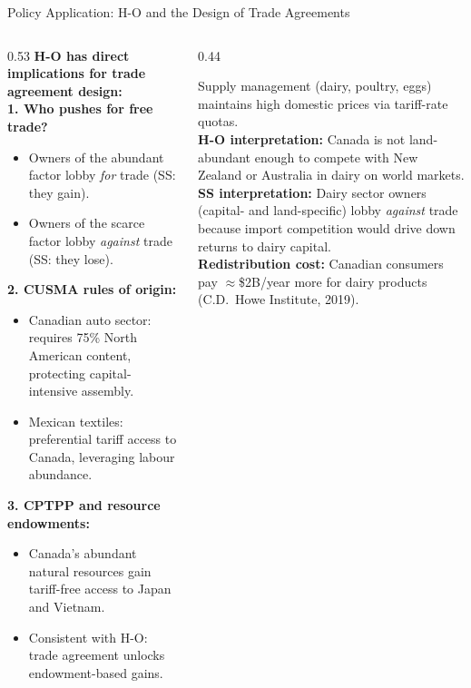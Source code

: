\documentclass[aspectratio=169]{beamer}
\begin{document}

\begin{frame}[shrink=15]{Policy Application: H-O and the Design of Trade Agreements}
\begin{columns}[T]
\begin{column}{0.53\textwidth}
\textbf{H-O has direct implications for trade
agreement design:}\\[0.4em]
\textbf{1. Who pushes for free trade?}
\begin{itemize}\small
  \item Owners of the abundant factor lobby
        \emph{for} trade (SS: they gain).
  \item Owners of the scarce factor lobby
        \emph{against} trade (SS: they lose).
\end{itemize}
\vspace{0.2em}
\textbf{2. CUSMA rules of origin:}
\begin{itemize}\small
  \item Canadian auto sector: requires 75\% North
        American content, protecting capital-intensive
        assembly.
  \item Mexican textiles: preferential tariff access
        to Canada, leveraging labour abundance.
\end{itemize}
\vspace{0.2em}
\textbf{3. CPTPP and resource endowments:}
\begin{itemize}\small
  \item Canada's abundant natural resources gain
        tariff-free access to Japan and Vietnam.
  \item Consistent with H-O: trade agreement unlocks
        endowment-based gains.
\end{itemize}
\end{column}
\begin{column}{0.44\textwidth}
\begin{canadex}
\small Supply management (dairy, poultry, eggs)
maintains high domestic prices via
tariff-rate quotas.\\[0.2em]
\textbf{H-O interpretation:} Canada is not
land-abundant enough to compete with New Zealand
or Australia in dairy on world markets.\\[0.2em]
\textbf{SS interpretation:} Dairy sector owners
(capital- and land-specific) lobby \emph{against}
trade because import competition would drive
down returns to dairy capital.\\[0.2em]
\textbf{Redistribution cost:} Canadian consumers
pay $\approx$\$2B/year more for dairy products
(C.D.\ Howe Institute, 2019).
\end{canadex}
\end{column}
\end{columns}
\end{frame}
\end{document}
